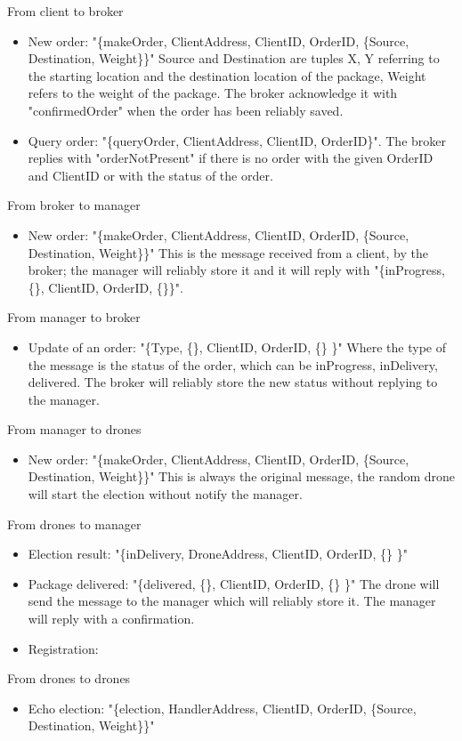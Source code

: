 \documentclass[a4paper, oneside]{memoir}
\begin{document}
From client to broker
\begin{itemize}
	\item New order: "\{makeOrder, ClientAddress, ClientID, OrderID, \{Source, Destination, Weight\}\}"
	Source and Destination are tuples {X, Y} referring to the starting location and the destination location of the package, Weight refers to the weight of the package. The broker acknowledge it with "confirmedOrder" when the order has been reliably saved.

	\item Query order: "\{queryOrder, ClientAddress, ClientID, OrderID\}". The broker replies with "orderNotPresent" if there is no order with the given OrderID and ClientID or with the status of the order.
\end{itemize} \vspace{1em}
From broker to manager
\begin{itemize}
	\item New order: "\{makeOrder, ClientAddress, ClientID, OrderID, \{Source, Destination, Weight\}\}"
	This is the message received from a client, by the broker; the manager will reliably store it and it will reply with "\{inProgress, \{\}, ClientID, OrderID, \{\}\}".
\end{itemize} \vspace{1em}
From manager to broker
\begin{itemize}
	\item Update of an order: "\{Type, \{\}, ClientID, OrderID, \{\} \}"
	Where the type of the message is the status of the order, which can be inProgress, inDelivery, delivered. The broker will reliably store the new status without replying to the manager.
\end{itemize}\vspace{1em}
From manager to drones
\begin{itemize}
	\item New order: "\{makeOrder, ClientAddress, ClientID, OrderID, \{Source, Destination, Weight\}\}"
	This is always the original message, the random drone will start the election without notify the manager.
\end{itemize} \vspace{1em}
From drones to manager
\begin{itemize}
	\item Election result: "\{inDelivery, DroneAddress, ClientID, OrderID, \{\} \}"

	\item Package delivered: "\{delivered, \{\}, ClientID, OrderID, \{\} \}"
	The drone will send the message to the manager which will reliably store it. The manager will reply with a confirmation.

	\item Registration:
\end{itemize} \vspace{1em}
From drones to drones
\begin{itemize}
	\item Echo election: "\{election, HandlerAddress, ClientID, OrderID, \{Source, Destination, Weight\}\}"
\end{itemize}
\newpage
\end{document}
